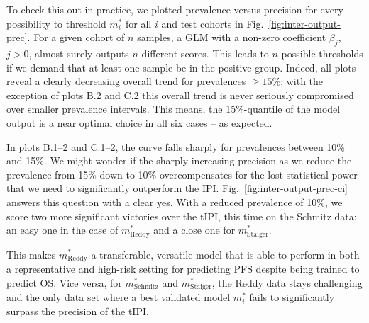 To check this out in practice, we plotted prevalence versus precision for every possibility to 
threshold $m^*_i$ for all $i$ and test cohorts in Fig.\ \ref{fig:inter-output-prec}. For a given 
cohort of $n$ samples, a GLM with a non-zero coefficient $\beta_j$, $j > 0$, almost surely 
outputs $n$ different scores. This leads to $n$ possible thresholds if we demand that at least one 
sample be in the positive group. Indeed, all 
plots reveal a clearly decreasing overall trend for prevalences $\geq \num{15}\%$; with the 
exception of plots B.2 and C.2 this overall trend is never seriously compromised over smaller 
prevalence intervals. This means, the \num{15}\%-quantile of the model output is a near optimal 
choice in all six cases -- as expected.

In plots B.1--2 and C.1--2, the curve falls sharply for prevalences between \num{10}\% and \num{15}\%. 
We might wonder if the sharply increasing precision as we reduce the prevalence from \num{15}\% 
down to \num{10}\% overcompensates for the lost statistical power that we need to significantly 
outperform the IPI. Fig.\ \ref{fig:inter-output-prec-ci} answers this question with a clear yes.
With a reduced prevalence of \num{10}\%, we score two more significant victories over the tIPI, this 
time on the Schmitz data: an easy one in the case of $m^*_\text{Reddy}$ and a close one
for $m^*_\text{Staiger}$. 

This makes $m^*_\text{Reddy}$ a transferable, versatile model that is 
able to perform in both a representative and high-risk setting for predicting PFS despite being 
trained to predict OS. Vice versa, for $m^*_\text{Schmitz}$ and $m^*_\text{Staiger}$, the Reddy data 
stays challenging and the only data set where a best validated model $m^*_i$ fails to significantly 
surpass the precision of the tIPI.